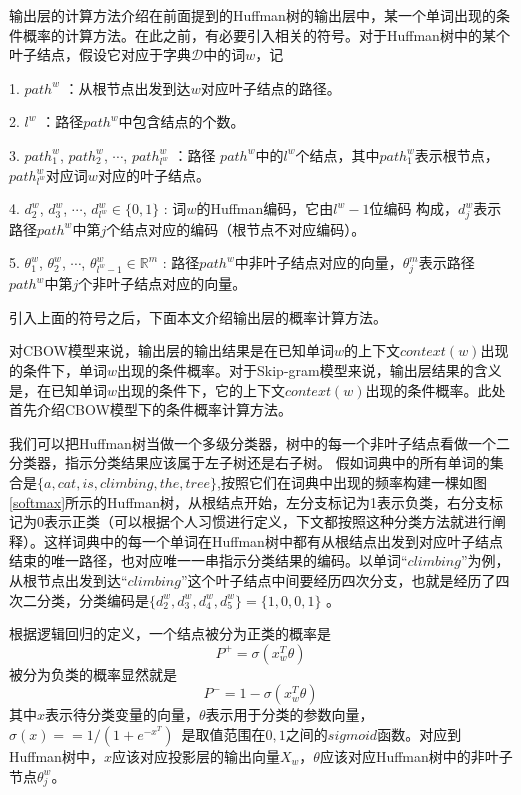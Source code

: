 输出层的计算方法介绍在前面提到的Huffman树的输出层中，某一个单词出现的条件概率的计算方法。在此之前，有必要引入相关的符号。对于Huffman树中的某个叶子结点，假设它对应于字典$\mathcal{D}$中的词$w$，记

\begin {itemize}
{
\item[] 1. $path^w$ ：从根节点出发到达$w$对应叶子结点的路径。

\item[] 2. $l^w$ ：路径$path^w$中包含结点的个数。

\item[] 3. $path_{1}^{w}$, $path_{2}^{w}$, $\cdots$, $path_{l^w}^{w}$ ：路径 $path^w$中的$l^w$个结点，其中$path_{1}^{w}$表示根节点，$path_{l^w}^{w}$对应词$w$对应的叶子结点。

\item[] 4. $d_{2}^{w}$, $d_{3}^{w}$, $\cdots$, $d_{l^w}^{w}\in \{0,1\}$ : 词$w$的Huffman编码，它由$l^w - 1$位编码
构成，$d_{j}^{w}$表示路径$path^w$中第$j$个结点对应的编码（根节点不对应编码）。

\item[] 5. $\theta_{1}^{w}$, $\theta_{2}^{w}$, $\cdots$, $\theta_{l^w - 1}^{w}\in \mathbb{R}^{m}$ : 路径$path^w$中非叶子结点对应的向量，$\theta_{j}^{m}$表示路径 $path^w$中第$j$个非叶子结点对应的向量。
}
\end {itemize}

引入上面的符号之后，下面本文介绍输出层的概率计算方法。

对CBOW模型来说，输出层的输出结果是在已知单词$w$的上下文$context(w)$出现的条件下，单词$w$出现的条件概率。对于Skip-gram模型来说，输出层结果的含义是，在已知单词$w$出现的条件下，它的上下文$context(w)$出现的条件概率。此处首先介绍CBOW模型下的条件概率计算方法。

我们可以把Huffman树当做一个多级分类器，树中的每一个非叶子结点看做一个二分类器，指示分类结果应该属于左子树还是右子树。
假如词典中的所有单词的集合是$\{a,cat,is,climbing,the,tree\}$,按照它们在词典中出现的频率构建一棵如图\ref{softmax}所示的Huffman树，从根结点开始，左分支标记为1表示负类，右分支标记为0表示正类（可以根据个人习惯进行定义，下文都按照这种分类方法就进行阐释）。这样词典中的每一个单词在Huffman树中都有从根结点出发到对应叶子结点结束的唯一路径，也对应唯一一串指示分类结果的编码。以单词“$climbing$”为例，从根节点出发到达“$climbing$”这个叶子结点中间要经历四次分支，也就是经历了四次二分类，分类编码是$\{d_{2}^{w}, d_{3}^{w},d_{4}^{w} ,d_{5}^{w}\} = \{1,0,0,1\}$ 。

根据逻辑回归的定义，一个结点被分为正类的概率是
\begin{equation}
P^+ =\sigma(x_{w}^{T}\theta )
\end{equation}
被分为负类的概率显然就是
\begin{equation}
 P^- =1 - \sigma(x_{w}^{T}\theta )
\end{equation}
其中$x$表示待分类变量的向量，$\theta$表示用于分类的参数向量，$\sigma(x) = = 1/(1+e^{-x^{T}} )$\
是取值范围在${0,1}$之间的$sigmoid$函数。对应到Huffman树中，$x$应该对应投影层的输出向量$X_w$，$\theta$应该对应Huffman树中的非叶子节点$\theta_{j}^{w}$。

